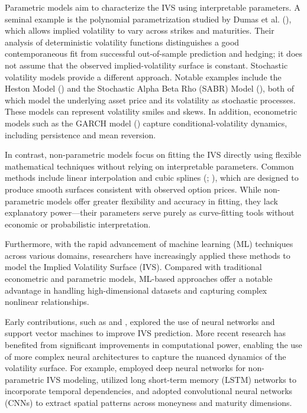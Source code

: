 Parametric models aim to characterize the IVS using interpretable parameters. A seminal example is the polynomial parametrization studied by Dumas et al. (\cite{dumas1998implied}), which allows implied volatility to vary across strikes and maturities. Their analysis of deterministic volatility functions distinguishes a good contemporaneous fit from successful out-of-sample prediction and hedging; it does not assume that the observed implied-volatility surface is constant. Stochastic volatility models provide a different approach. Notable examples include the Heston Model (\cite{Heston:1993}) and the Stochastic Alpha Beta Rho (SABR) Model (\cite{sabr2002}), both of which model the underlying asset price and its volatility as stochastic processes. These models can represent volatility smiles and skews. In addition, econometric models such as the GARCH model (\cite{Bollerslev:1986}) capture conditional-volatility dynamics, including persistence and mean reversion.


In contrast, non-parametric models focus on fitting the IVS directly using flexible mathematical techniques without relying on interpretable parameters. Common methods include linear interpolation and cubic splines (\cite{kahale2004arbitrage}; \cite{wang2004no}), which are designed to produce smooth surfaces consistent with observed option prices. While non-parametric models offer greater flexibility and accuracy in fitting, they lack explanatory power—their parameters serve purely as curve-fitting tools without economic or probabilistic interpretation.





Furthermore, with the rapid advancement of machine learning (ML) techniques across various domains, researchers have increasingly applied these methods to model the Implied Volatility Surface (IVS). Compared with traditional econometric and parametric models, ML-based approaches offer a notable advantage in handling high-dimensional datasets and capturing complex nonlinear relationships.


Early contributions, such as \cite{malliaris1996using} and \cite{guidolin2003option}, explored the use of neural networks and support vector machines to improve IVS prediction. More recent research has benefited from significant improvements in computational power, enabling the use of more complex neural architectures to capture the nuanced dynamics of the volatility surface. For example, \cite{ackerer2020deep} employed deep neural networks for non-parametric IVS modeling, \cite{medvedev2022multistep} utilized long short-term memory (LSTM) networks to incorporate temporal dependencies, and \cite{kelly2023deep} adopted convolutional neural networks (CNNs) to extract spatial patterns across moneyness and maturity dimensions.

